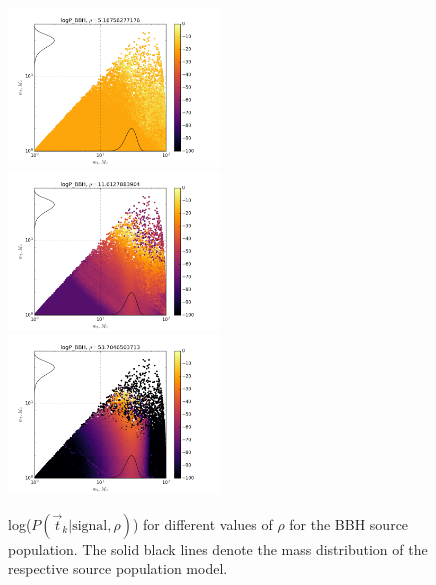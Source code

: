 \documentclass[twocolumn,showpacs,unsortedaddress,superscriptaddress,showkeys,nofootinbib,preprintnumbers,letterpaper]{revtex4-1}
\begin{document}
\begin{figure}
\includegraphics[width=0.5\textwidth]{logP_BBHrho5_18758277176.png}
\includegraphics[width=0.5\textwidth]{logP_BBHrho11_6127883904.png}
\includegraphics[width=0.5\textwidth]{logP_BBHrho53_7046503713.png}
\caption{log($P(\vec{t}_k|\text{signal},\rho)$) for different values of $\rho$ for the BBH source population. The solid black lines denote the mass distribution of the respective source population model.}
\label{fig:P_tkj_BBH}
\end{figure}
\end{document}
